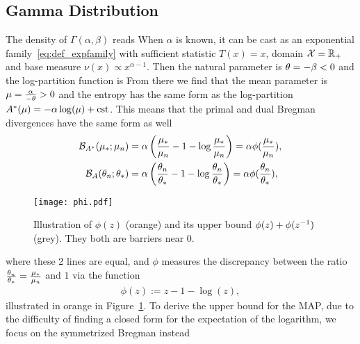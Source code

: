 \begin{subappendices}
\subsection{Gamma Distribution}
\label{app:gamma}
The density of $\Gamma(\alpha,\beta)$ reads
When $\alpha$ is known, it can be cast as an exponential family~\eqref{eq:def_expfamily} with sufficient statistic $T(x)=x$, domain ${\mathcal X} = \mathbb{R}_+$ and base measure $\nu(x)\propto x^{\alpha-1}$. Then the natural parameter is $\theta = -\beta < 0$ and the log-partition function is
From there we find that the mean parameter is $\mu = \frac{\alpha}{-\theta} >0$ and the entropy has the same form as the log-partition ${A^*}(\mu) = - \alpha \log(\mu) + \operatorname{cst}$.
This means that the primal and dual Bregman divergences have the same form as well
\begin{align}
	{\mathcal B}_{A^*}(\mu_*; \mu_n) 
	&= \alpha \left ( \frac{\mu_*}{ \mu_n} - 1 - \log  \frac{\mu_*}{ \mu_n} \right) 
	= \alpha \phi(\frac{\mu_*}{ \mu_n}),
	\\
	{\mathcal B}_A( \theta_n; \theta_* ) 
	&=  \alpha \left ( \frac{ \theta_n}{\theta_*} - 1 - \log  \frac{ \theta_n}{\theta_*} \right)
	= \alpha \phi(\frac{ \theta_n}{\theta_*}),
\end{align}
\begin{wrapfigure}[12]{l}{0.3\textwidth}
	\centering
	\texttt{[image: phi.pdf]}
	\caption[Illustration of $\phi(z)$ and its upper bound.]{
	Illustration of $\phi(z)$ (orange) and its upper bound $\phi(z) + \phi(z^{-1})$ (grey).
	They both are barriers near $0$.
	}
	\label{fig:phi}
\end{wrapfigure}
where these 2 lines are equal, and $\phi$ measures the discrepancy between the ratio $\frac{ \theta_n}{\theta_*} =  \frac{\mu_*}{ \mu_n}  $ and $1$ via the function
\begin{align}
	\phi(z) := z - 1 - \log(z),
\end{align}
illustrated in orange in Figure~\ref{fig:phi}.
To derive the upper bound for the MAP, due to the difficulty of finding a closed form for the expectation of the logarithm, we focus on the symmetrized Bregman instead


\end{subappendices}
